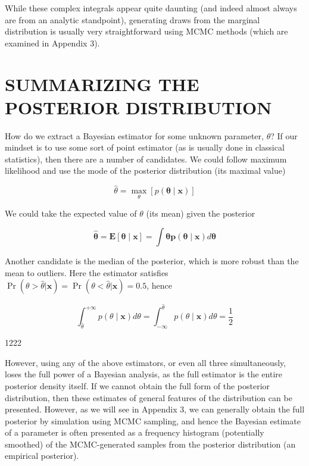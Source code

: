 \documentclass{article}
\begin{document}
While these complex integrals appear quite daunting (and indeed almost always are from an analytic standpoint), generating draws from the marginal distribution is usually very straightforward using MCMC methods (which are examined in Appendix 3).

\section{SUMMARIZING THE POSTERIOR DISTRIBUTION}
How do we extract a Bayesian estimator for some unknown parameter,  $ \theta $? If our mindset is to use some sort of point estimator (as is usually done in classical statistics), then there are a number of candidates. We could follow maximum likelihood and use the mode of the posterior distribution (its maximal value)

\begin{equation}
\widehat{\theta}=\max_{\theta}\left[p(\boldsymbol{\theta}\mid\mathbf{x})\right]
\end{equation}

We could take the expected value of  $ \theta $ (its mean) given the posterior

\begin{equation}
\widehat{\boldsymbol{\theta}}=\boldsymbol{E}[\boldsymbol{\theta}\mid\mathbf{x}]=\int\boldsymbol{\theta}\boldsymbol{p}(\boldsymbol{\theta}\mid\mathbf{x})d\boldsymbol{\theta}
\end{equation}

Another candidate is the median of the posterior, which is more robust than the mean to outliers. Here the estimator satisfies  $ \Pr(\theta > \widehat{\theta} | \mathbf{x}) = \Pr(\theta < \widehat{\theta} | \mathbf{x}) = 0.5 $, hence

\begin{equation}
\int_{\widehat{\theta}}^{+\infty}p(\theta\mid\mathbf{x})d\theta=\int_{-\infty}^{\widehat{\theta}}p(\theta\mid\mathbf{x})d\theta=\frac{1}{2}
\end{equation}

1222

However, using any of the above estimators, or even all three simultaneously, loses the full power of a Bayesian analysis, as the full estimator is the entire posterior density itself. If we cannot obtain the full form of the posterior distribution, then these estimates of general features of the distribution can be presented. However, as we will see in Appendix 3, we can generally obtain the full posterior by simulation using MCMC sampling, and hence the Bayesian estimate of a parameter is often presented as a frequency histogram (potentially smoothed) of the MCMC-generated samples from the posterior distribution (an empirical posterior).
\end{document}
